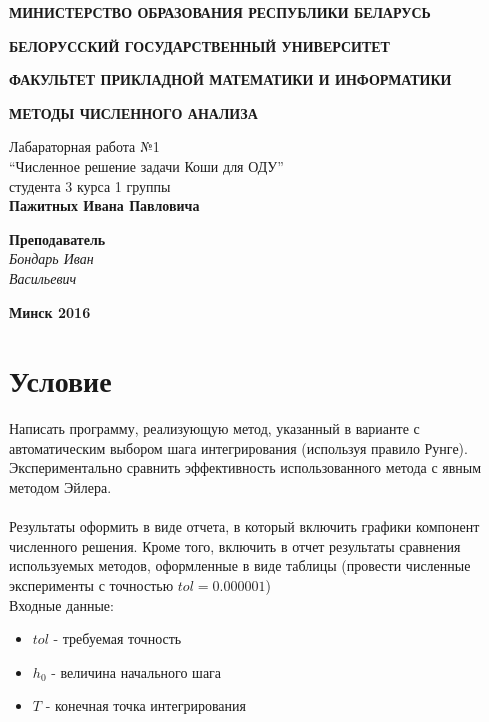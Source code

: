 \documentclass[oneside, final, 11pt]{article}
\begin{document}
\begin{titlepage}

\centerline{\large \bf МИНИСТЕРСТВО ОБРАЗОВАНИЯ РЕСПУБЛИКИ БЕЛАРУСЬ}
\bigskip
\bigskip
\centerline{\large \bf БЕЛОРУССКИЙ ГОСУДАРСТВЕННЫЙ УНИВЕРСИТЕТ}
\bigskip
\bigskip
\centerline{\large \bf ФАКУЛЬТЕТ ПРИКЛАДНОЙ МАТЕМАТИКИ И ИНФОРМАТИКИ}
\vfill
\vfill
\vfill
\centerline{\large \bf МЕТОДЫ ЧИСЛЕННОГО АНАЛИЗА}
\bigskip
\bigskip
\vfill
\begin{centering}
  \large Лабараторная работа №1 \\ 
 ``Численное решение задачи Коши для ОДУ'' \\
  студента 3 курса 1 группы \\
  \bf Пажитных Ивана Павловича \\
\end{centering}
\vfill
\vfill
\hfill
\begin{minipage}{0.25\textwidth}
  {\large{\bf Преподаватель} \\
{\it Бондарь Иван \\ Васильевич}}
\end{minipage}
\vfill
\vfill
\centerline{\large \bf Минск 2016}

\end{titlepage}

\restoregeometry

\section{Условие}
Написать программу, реализующую метод, указанный в варианте с автоматическим выбором шага интегрирования (используя правило Рунге). Экспериментально сравнить эффективность использованного метода с явным методом Эйлера.\\ \\
Результаты оформить в виде отчета, в который включить графики компонент численного решения. Кроме того, включить в отчет результаты сравнения используемых методов, оформленные в виде таблицы (провести численные эксперименты с точностью $tol = 0.000001$)\\

Входные данные:
\begin{itemize}
    \item $tol$ - требуемая точность
    \item $h_0$ - величина начального шага
    \item $T$ - конечная точка интегрирования
\end{itemize}
\end{document}

